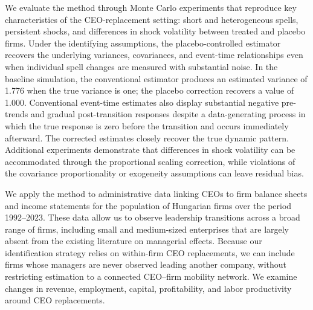 \documentclass[sigconf,nonacm]{acmart}
\begin{document}
We evaluate the method through Monte Carlo experiments that reproduce key
characteristics of the CEO-replacement setting: short and heterogeneous
spells, persistent shocks, and differences in shock volatility between
treated and placebo firms. Under the identifying assumptions, the
placebo-controlled estimator recovers the underlying variances,
covariances, and event-time relationships even when individual spell
changes are measured with substantial noise. In the baseline simulation,
the conventional estimator produces an estimated variance of 1.776 when
the true variance is one; the placebo correction recovers a value of
1.000. Conventional event-time estimates also display substantial
negative pre-trends and gradual post-transition responses despite a
data-generating process in which the true response is zero before the
transition and occurs immediately afterward. The corrected estimates
closely recover the true dynamic pattern. Additional experiments
demonstrate that differences in shock volatility can be accommodated
through the proportional scaling correction, while violations of the
covariance proportionality or exogeneity assumptions can leave residual
bias.

\medskip
\noindent{}
\medskip

We apply the method to administrative data linking CEOs to firm balance
sheets and income statements for the population of Hungarian firms over
the period 1992--2023. These data allow us to observe leadership
transitions across a broad range of firms, including small and
medium-sized enterprises that are largely absent from the existing
literature on managerial effects. Because our identification strategy
relies on within-firm CEO replacements, we can include firms whose
managers are never observed leading another company, without restricting
estimation to a connected CEO--firm mobility network. We examine changes
in revenue, employment, capital, profitability, and labor productivity
around CEO replacements.
\end{document}
